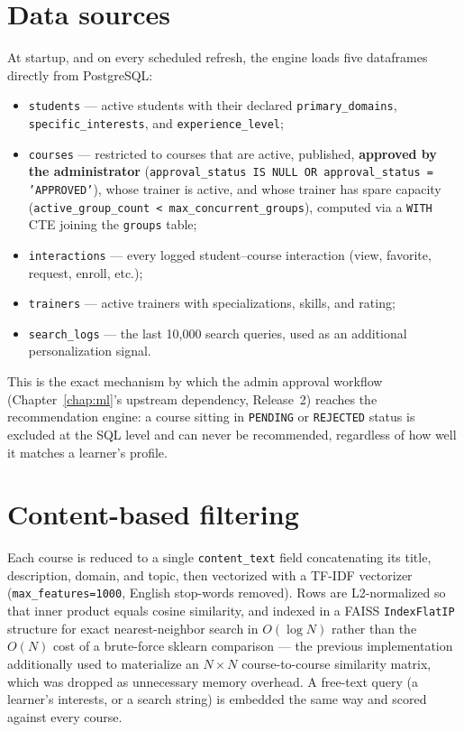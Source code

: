 \documentclass[a4paper,12pt]{report}
\begin{document}
\section{Data sources}
At startup, and on every scheduled refresh, the engine loads five
dataframes directly from PostgreSQL:
\begin{itemize}[leftmargin=*]
  \item \texttt{students} --- active students with their declared
        \texttt{primary\_domains}, \texttt{specific\_interests}, and
        \texttt{experience\_level};
  \item \texttt{courses} --- restricted to courses that are active,
        published, \textbf{approved by the administrator}
        (\texttt{approval\_status IS NULL OR approval\_status = 'APPROVED'}),
        whose trainer is active, and whose trainer has spare capacity
        (\texttt{active\_group\_count < max\_concurrent\_groups}), computed via
        a \texttt{WITH} CTE joining the \texttt{groups} table;
  \item \texttt{interactions} --- every logged student--course interaction
        (view, favorite, request, enroll, etc.);
  \item \texttt{trainers} --- active trainers with specializations,
        skills, and rating;
  \item \texttt{search\_logs} --- the last 10{,}000 search queries, used
        as an additional personalization signal.
\end{itemize}

This is the exact mechanism by which the admin approval workflow
(Chapter~\ref{chap:ml}'s upstream dependency, Release~2) reaches the
recommendation engine: a course sitting in \texttt{PENDING} or
\texttt{REJECTED} status is excluded at the SQL level and can never be
recommended, regardless of how well it matches a learner's profile.

\section{Content-based filtering}
Each course is reduced to a single \texttt{content\_text} field
concatenating its title, description, domain, and topic, then vectorized
with a TF-IDF vectorizer (\texttt{max\_features=1000},
English stop-words removed). Rows are L2-normalized so that inner product
equals cosine similarity, and indexed in a FAISS \texttt{IndexFlatIP}
structure for exact nearest-neighbor search in $O(\log N)$ rather than the
$O(N)$ cost of a brute-force sklearn comparison — the previous
implementation additionally used to materialize an $N \times N$
course-to-course similarity matrix, which was dropped as unnecessary
memory overhead. A free-text query (a learner's interests, or a search
string) is embedded the same way and scored against every course.
\end{document}
